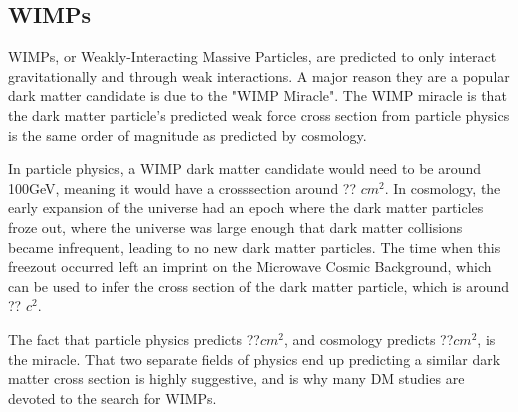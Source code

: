 \subsection{WIMPs}

WIMPs, or Weakly-Interacting Massive Particles, are predicted to only interact gravitationally and through weak interactions.
A major reason they are a popular dark matter candidate is due to the "WIMP Miracle".
The WIMP miracle is that the dark matter particle's predicted weak force cross section from particle physics is the same order of magnitude as predicted by cosmology.

In particle physics, a WIMP dark matter candidate would need to be around 100GeV, meaning it would have a crosssection around ?? $cm^{2}$.
In cosmology, the early expansion of the universe had an epoch where the dark matter particles froze out, where the universe was large enough that dark matter collisions became infrequent, leading to no new dark matter particles.
The time when this freezout occurred left an imprint on the Microwave Cosmic Background, which can be used to infer the cross section of the dark matter particle, which is around ?? $c^{2}$.

The fact that particle physics predicts ??$cm^{2}$, and cosmology predicts ??$cm^{2}$, is the miracle.
That two separate fields of physics end up predicting a similar dark matter cross section is highly suggestive, and is why many DM studies are devoted to the search for WIMPs.



